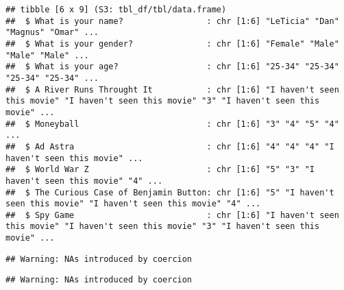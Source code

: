 \documentclass[]{article}
\newenvironment{Shaded}{\begin{snugshade}}{\end{snugshade}}
\newcommand{\CommentTok}[1]{\textcolor[rgb]{0.56,0.35,0.01}{\textit{#1}}}
\newcommand{\DataTypeTok}[1]{\textcolor[rgb]{0.13,0.29,0.53}{#1}}
\newcommand{\KeywordTok}[1]{\textcolor[rgb]{0.13,0.29,0.53}{\textbf{#1}}}
\newcommand{\NormalTok}[1]{#1}
\newcommand{\OperatorTok}[1]{\textcolor[rgb]{0.81,0.36,0.00}{\textbf{#1}}}
\newcommand{\StringTok}[1]{\textcolor[rgb]{0.31,0.60,0.02}{#1}}
\begin{document}
\begin{verbatim}
## tibble [6 x 9] (S3: tbl_df/tbl/data.frame)
##  $ What is your name?                 : chr [1:6] "LeTicia" "Dan" "Magnus" "Omar" ...
##  $ What is your gender?               : chr [1:6] "Female" "Male" "Male" "Male" ...
##  $ What is your age?                  : chr [1:6] "25-34" "25-34" "25-34" "25-34" ...
##  $ A River Runs Throught It           : chr [1:6] "I haven't seen this movie" "I haven't seen this movie" "3" "I haven't seen this movie" ...
##  $ Moneyball                          : chr [1:6] "3" "4" "5" "4" ...
##  $ Ad Astra                           : chr [1:6] "4" "4" "4" "I haven't seen this movie" ...
##  $ World War Z                        : chr [1:6] "5" "3" "I haven't seen this movie" "4" ...
##  $ The Curious Case of Benjamin Button: chr [1:6] "5" "I haven't seen this movie" "I haven't seen this movie" "4" ...
##  $ Spy Game                           : chr [1:6] "I haven't seen this movie" "I haven't seen this movie" "3" "I haven't seen this movie" ...
\end{verbatim}

\begin{Shaded}
\end{Shaded}

\begin{verbatim}
## Warning: NAs introduced by coercion
\end{verbatim}

\begin{Shaded}
\end{Shaded}

\begin{verbatim}
## Warning: NAs introduced by coercion
\end{verbatim}
\end{document}
